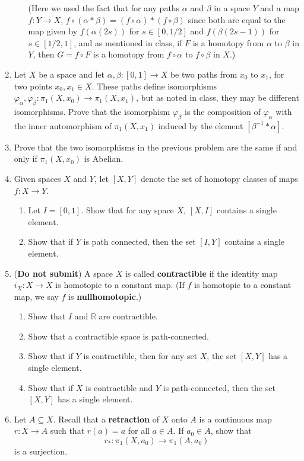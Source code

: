 \documentclass[letterpaper,12pt]{article}
\newcommand{\R}{\mathbb{R}}
\newcommand{\cla}[1]{\left[ #1\right]}
\begin{document}
\begin{enumerate}
\begin{enumerate}
(Here we used the fact that for any paths $\alpha$ and $\beta$ in a space $Y$ and a map $f:Y\to X$, $f\circ(\alpha\ast\beta) = (f\circ \alpha)\ast(f\circ \beta)$ since both are equal to the map given by $f(\alpha(2s))$ for $s\in [0,1/2]$ and $f(\beta(2s-1))$ for $s\in [1/2,1]$, and as mentioned in class, if $F$ is a homotopy from $\alpha$ to $\beta$ in $Y$, then $G=f\circ F$ is a homotopy from $f\circ \alpha$ to $f\circ \beta$ in $X$.)
\end{enumerate}
\item Let $X$ be a space and let $\alpha,\beta:[0,1]\to X$ be two paths from $x_0$ to $x_1$, for two points $x_0,x_1\in X$. These paths define isomorphisms $\varphi_\alpha,\varphi_\beta:\pi_1(X,x_0)\to \pi_1(X,x_1)$, but as noted in class, they may be different isomorphisms. Prove that the isomorphism $\varphi_\beta$ is the composition of $\varphi_\alpha$ with the inner automorphism of $\pi_1(X,x_1)$ induced by the element $\cla{\beta^{-1}\ast\alpha}$.
\item Prove that the two isomorphisms in the previous problem are the same if and only if $\pi_1(X,x_0)$ is Abelian.
\item Given spaces $X$ and $Y$, let $\cla{X,Y}$ denote the set of homotopy classes of maps $f:X\to Y$.
\begin{enumerate}
\item Let $I=[0,1]$. Show that for any space $X$, $\cla{X,I}$ contains a single element.
\item Show that if $Y$ is path connected, then the set $\cla{I,Y}$ contains a single element.
\end{enumerate}
\item ({\bf Do not submit}) A space $X$ is called {\bf contractible} if the identity map $i_X:X\to X$ is homotopic to a constant map. (If $f$ is homotopic to a constant map, we say $f$ is {\bf nullhomotopic}.)
\begin{enumerate}
\item Show that $I$ and $\R$ are contractible.
\item Show that a contractible space is path-connected.
\item Show that if $Y$ is contractible, then for any set $X$, the set $\cla{X,Y}$ has a single element.
\item Show that if $X$ is contractible and $Y$ is path-connected, then the set $\cla{X,Y}$ has a single element.
\end{enumerate}
\item Let $A\subseteq X$. Recall that a {\bf retraction} of $X$ onto $A$ is a continuous map $r:X\to A$ such that $r(a)=a$ for all $a\in A$. If $a_0\in A$, show that
\[
r_*:\pi_1(X,a_0)\to \pi_1(A,a_0)
\]
is a surjection.
\end{enumerate}
\end{document}
